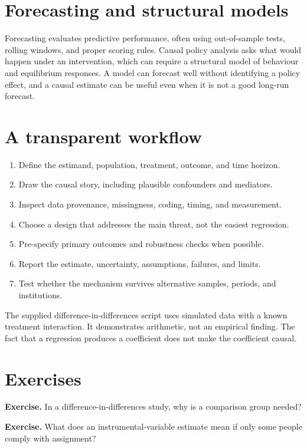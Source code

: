 \documentclass[11pt,oneside,openany]{book}
\newcommand{\exercise}[1]{\textbf{Exercise.} #1}
\begin{document}
\section{Forecasting and structural models}

Forecasting evaluates predictive performance, often using out-of-sample tests, rolling windows, and proper scoring rules. Causal policy analysis asks what would happen under an intervention, which can require a structural model of behaviour and equilibrium responses. A model can forecast well without identifying a policy effect, and a causal estimate can be useful even when it is not a good long-run forecast.

\section{A transparent workflow}

\begin{enumerate}
  \item Define the estimand, population, treatment, outcome, and time horizon.
  \item Draw the causal story, including plausible confounders and mediators.
  \item Inspect data provenance, missingness, coding, timing, and measurement.
  \item Choose a design that addresses the main threat, not the easiest regression.
  \item Pre-specify primary outcomes and robustness checks when possible.
  \item Report the estimate, uncertainty, assumptions, failures, and limits.
  \item Test whether the mechanism survives alternative samples, periods, and institutions.
\end{enumerate}

The supplied difference-in-differences script uses simulated data with a known treatment interaction. It demonstrates arithmetic, not an empirical finding. The fact that a regression produces a coefficient does not make the coefficient causal.

\section{Exercises}

\exercise{In a difference-in-differences study, why is a comparison group needed?}

\exercise{What does an instrumental-variable estimate mean if only some people comply with assignment?}
\end{document}
